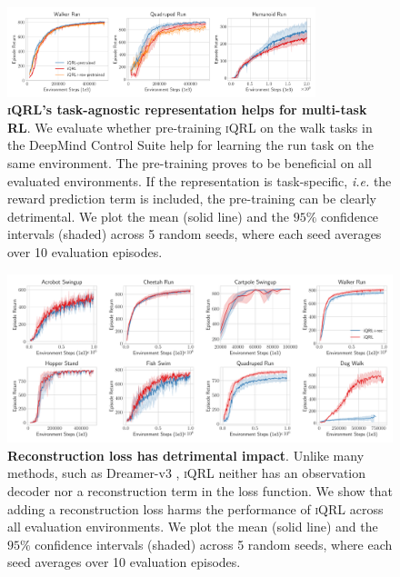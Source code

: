 \documentclass{article}
\makeatletter
\theoremstyle{plain}
\theoremstyle{definition}
\theoremstyle{remark}
\newcommand{\our}{\textsc{iQRL}\xspace}
\newcommand{\ie}{\textit{i.e.\@}\xspace}
\makeatother
\begin{document}
\begin{figure}[ht]
	\vskip 0.2in
	\begin{center}
		\centerline{\includegraphics[width=0.8\textwidth]{./figs/task-agnostic-ablation.pdf}}
		\caption{\textbf{\our's task-agnostic representation helps for multi-task RL}. We evaluate whether pre-training \our on the walk tasks in the DeepMind Control Suite help for learning the run task on the same environment. The pre-training proves to be beneficial on all evaluated environments. If the representation is task-specific, \ie the reward prediction term is included, the pre-training can be clearly detrimental. We plot the mean (solid line) and the $95\%$ confidence intervals (shaded) across 5 random seeds, where each seed averages over 10 evaluation episodes.}
		\label{fig:multi-task-pretraining}
	\end{center}
	\vskip -0.2in
\end{figure}


\begin{figure}[ht]
	\vskip 0.2in
	\begin{center}
		\centerline{\includegraphics[width=1.0\textwidth]{./figs/reconstruction-loss-ablation.pdf}}
		\caption{\textbf{Reconstruction loss has detrimental impact}. Unlike many methods, such as Dreamer-v3 \cite{hafner2023mastering}, \our neither has an observation decoder nor a reconstruction term in the loss function. We show that adding a reconstruction loss harms the performance of \our across all evaluation environments. We plot the mean (solid line) and the $95\%$ confidence intervals (shaded) across 5 random seeds, where each seed averages over 10 evaluation episodes.}
		\label{fig:reconstruction-loss-ablation}
	\end{center}
	\vskip -0.2in
\end{figure}
\end{document}
